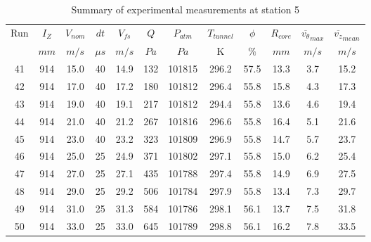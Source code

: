 \begin{table}[H]
\begin{center}
\begin{tabular}{|cccccccccccc|}
	\hline
	Run & $I_Z$ & $V_{nom}$ & $dt$ & $V_{fs}$ & $Q$ & $P_{atm}$ & $T_{tunnel}$ & $\phi$ & $R_{core}$ & $\overline{v_{\theta}}_{max}$ & $\overline{v_{z}}_{mean}$\\
	  & $mm$ & $m/s$ & $\mu s$ & $m/s$ & $Pa$ & $Pa$ & K & $\%$ & $mm$ & $m/s$ & $m/s$\\
	\hline
	41 & 914 & 15.0 & 40 & 14.9 & 132 & 101815 & 296.2 & 57.5 & 13.3 & 3.7 & 15.2\\
	42 & 914 & 17.0 & 40 & 17.2 & 180 & 101812 & 296.4 & 55.8 & 15.8 & 4.3 & 17.3\\
	43 & 914 & 19.0 & 40 & 19.1 & 217 & 101812 & 294.4 & 55.8 & 13.6 & 4.6 & 19.4\\
	44 & 914 & 21.0 & 40 & 21.2 & 267 & 101816 & 296.6 & 55.8 & 16.4 & 5.1 & 21.6\\
	45 & 914 & 23.0 & 40 & 23.2 & 323 & 101809 & 296.9 & 55.8 & 14.7 & 5.7 & 23.7\\
	46 & 914 & 25.0 & 25 & 24.9 & 371 & 101802 & 297.1 & 55.8 & 15.0 & 6.2 & 25.4\\
	47 & 914 & 27.0 & 25 & 27.1 & 435 & 101788 & 297.4 & 55.8 & 14.9 & 6.9 & 27.5\\
	48 & 914 & 29.0 & 25 & 29.2 & 506 & 101784 & 297.9 & 55.8 & 13.4 & 7.3 & 29.7\\
	49 & 914 & 31.0 & 25 & 31.3 & 584 & 101786 & 298.1 & 56.1 & 13.7 & 7.5 & 31.8\\
	50 & 914 & 33.0 & 25 & 33.0 & 645 & 101789 & 298.8 & 56.1 & 16.2 & 7.8 & 33.5\\
	\hline
\end{tabular}
\caption{Summary of experimental measurements at station 5}
\label{table:experiment_results_5}
\end{center}
\end{table}
